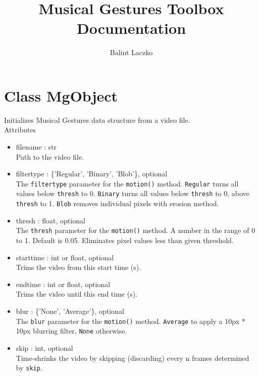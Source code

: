 \documentclass[9pt]{extarticle}
\title{Musical Gestures Toolbox\\ \large{Documentation}}
\author{Balint Laczko}
\def\code#1{\texttt{#1}}
\begin{document}
\maketitle

\tableofcontents


\section{Class MgObject}
Initializes Musical Gestures data structure from a video file.\\

\noindent Attributes

\begin{itemize}

\item filename : str\\
Path to the video file.

\item filtertype : \{'Regular', 'Binary', 'Blob'\}, optional\\
The \code{filtertype} parameter for the \code{motion()} method. 
\code{Regular} turns all values below \code{thresh} to 0. 
\code{Binary} turns all values below \code{thresh} to 0, 
above \code{thresh} to 1. \code{Blob} removes individual pixels 
with erosion method.

\item thresh : float, optional\\
The \code{thresh} parameter for the \code{motion()} method. 
A number in the range of 0 to 1. Default is 0.05. Eliminates pixel 
values less than given threshold.

\item starttime : int or float, optional\\
Trims the video from this start time (s).

\item endtime : int or float, optional\\
Trims the video until this end time (s).

\item blur : \{'None', 'Average'\}, optional\\
The \code{blur} parameter for the \code{motion()} method.
\code{Average} to apply a 10px * 10px blurring filter, \code{None} 
otherwise.

\item skip : int, optional\\
Time-shrinks the video by skipping (discarding) 
every n frames determined by \code{skip}.


\end{itemize}
\end{document}
